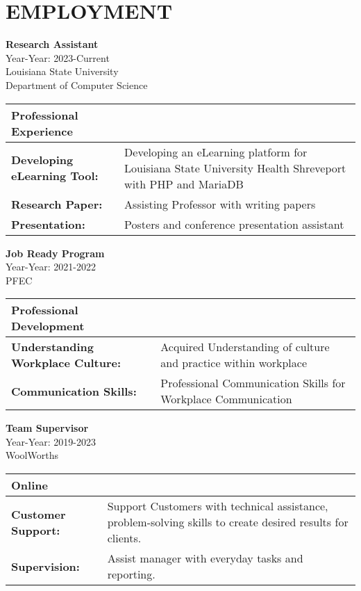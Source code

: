 \documentclass[a4paper,9pt]{article}
\begin{document}
\section*{EMPLOYMENT}
\noindent
\newline
\textbf{Research Assistant} \\
Year-Year: 2023-Current \\
Louisiana State University \\ 
Department of Computer Science \\
\begin{table}[h]
\centering
\begin{tabular}{|p{}|p{}|}
\hline
\textbf{Professional Experience} & \\
\hline
\textbf{Developing eLearning Tool:} & Developing an eLearning platform for Louisiana State University Health Shreveport with PHP and MariaDB \\
\hline
\textbf{Research Paper:} & Assisting Professor with writing papers \\
\hline
\textbf{Presentation:} & Posters and conference presentation assistant \\
\hline
\end{tabular}
\end{table}

\noindent
\textbf{Job Ready Program} \\
Year-Year: 2021-2022 \\
PFEC \\ 
\begin{table}[h]
\centering
\begin{tabular}{|p{}|p{}|}
\hline
\textbf{Professional Development} & \\
\hline
\textbf{Understanding Workplace Culture:} & Acquired Understanding of culture and practice within workplace \\
\hline
\textbf{Communication Skills:} & Professional Communication Skills for Workplace Communication \\
\hline
\end{tabular}
\end{table}

\textbf{Team Supervisor} \\
Year-Year: 2019-2023 \\
WoolWorths \\ 

\begin{table}[h]
\centering
\begin{tabular}{|p{}|p{}|}
\hline
\textbf{Online} & \\
\hline
\textbf{Customer Support:} & Support Customers with technical assistance, problem-solving skills to create desired results for clients. \\
\hline
\textbf{Supervision:} & Assist manager with everyday tasks and reporting. \\
\hline
\end{tabular}
\end{table}
\end{document}
